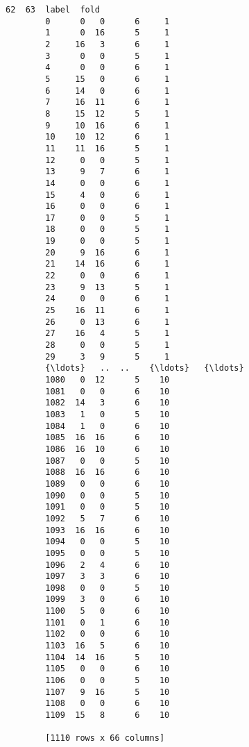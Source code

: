 \documentclass[11pt]{article}
\begin{document}
\begin{Verbatim}[commandchars=\\\{\}]
              62  63  label  fold  
        0      0   0      6     1  
        1      0  16      5     1  
        2     16   3      6     1  
        3      0   0      5     1  
        4      0   0      6     1  
        5     15   0      6     1  
        6     14   0      6     1  
        7     16  11      6     1  
        8     15  12      5     1  
        9     10  16      6     1  
        10    10  12      6     1  
        11    11  16      5     1  
        12     0   0      5     1  
        13     9   7      6     1  
        14     0   0      6     1  
        15     4   0      6     1  
        16     0   0      6     1  
        17     0   0      5     1  
        18     0   0      5     1  
        19     0   0      5     1  
        20     9  16      6     1  
        21    14  16      6     1  
        22     0   0      6     1  
        23     9  13      5     1  
        24     0   0      6     1  
        25    16  11      6     1  
        26     0  13      6     1  
        27    16   4      5     1  
        28     0   0      5     1  
        29     3   9      5     1  
        {\ldots}   ..  ..    {\ldots}   {\ldots}  
        1080   0  12      5    10  
        1081   0   0      6    10  
        1082  14   3      6    10  
        1083   1   0      5    10  
        1084   1   0      6    10  
        1085  16  16      6    10  
        1086  16  10      6    10  
        1087   0   0      5    10  
        1088  16  16      6    10  
        1089   0   0      6    10  
        1090   0   0      5    10  
        1091   0   0      5    10  
        1092   5   7      6    10  
        1093  16  16      6    10  
        1094   0   0      5    10  
        1095   0   0      5    10  
        1096   2   4      6    10  
        1097   3   3      6    10  
        1098   0   0      5    10  
        1099   3   0      6    10  
        1100   5   0      6    10  
        1101   0   1      6    10  
        1102   0   0      6    10  
        1103  16   5      6    10  
        1104  14  16      5    10  
        1105   0   0      6    10  
        1106   0   0      5    10  
        1107   9  16      5    10  
        1108   0   0      6    10  
        1109  15   8      6    10  
        
        [1110 rows x 66 columns]
\end{Verbatim}
            
\end{document}
